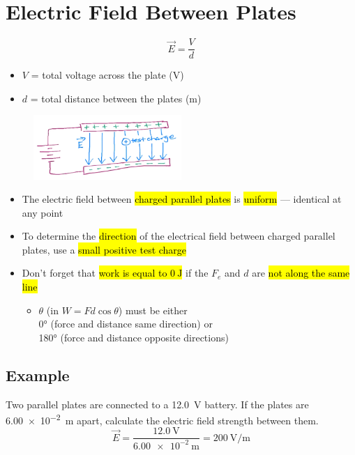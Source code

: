 \documentclass[a4paper,12pt]{article}
\begin{document}
\pagebreak
\section{Electric Field Between Plates}
\Large $$\vec{E} = \frac{V}{d}$$ \normalsize
\begin{itemize}
    \item{$V$ = total voltage across the plate (\si{\volt})}
    \item{$d$ = total distance between the plates (\si{\meter})}
\end{itemize}

\begin{figure}[H]
    \centering
    \includegraphics[width=0.50\textwidth]{plate}
\end{figure}

\begin{itemize}
    \item{The electric field between \hl{charged parallel plates} is \hl{uniform} --- identical at any point}
    \item{To determine the \hl{direction} of the electrical field between charged parallel plates, use a \hl{small positive test charge}}
    \item{
        Don't forget that \hl{work is equal to $\SI{0}{\joule}$} if the $F_e$ and $d$ are \hl{not along the same line}
        \begin{itemize}
            \item{$\theta$ (in $W = Fd\cos{\theta}$) must be either\\\ang{0} (force and distance same direction) or \\\ang{180} (force and distance opposite directions)}
        \end{itemize}
    }
\end{itemize}

\subsection{Example}
Two parallel plates are connected to a \SI{12.0}{\volt} battery. If the plates are \SI{6.00e-2}{\m} apart, calculate the electric field strength between them.
$$\vec{E} = \frac{\SI{12.0}{\volt}}{\SI{6.00e-2}{\m}} = \SI{200}{\volt\per\m}$$
\end{document}
